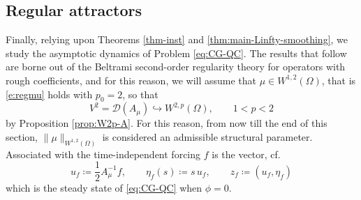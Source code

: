 \documentclass[12pt,leqno]{amsart}
\theoremstyle{definition}
\numberwithin{equation}{section}
\numberwithin{figure}{section}
\begin{document}
 \subsection{Regular   attractors}\label{subsec:main-expattr} Finally, relying upon Theorems \ref{thm-inst} and \ref{thm:main-Linfty-smoothing}, we study the asymptotic dynamics of Problem \eqref{eq:CG-QC}.
The results that follow are borne out of the Beltrami second-order regularity theory for operators with rough coefficients, and for this reason, we will assume  that $\mu \in W^{1,2}(\Omega)$, that is \eqref{e:regmu} holds with $p_0=2$, so that
\[
{V^2} = \mathcal D(A_\mu) \hookrightarrow W^{2,p}(\Omega), \qquad 1<p<2
\]
by Proposition \ref{prop:W2p-A}.
 For this reason, from now till the end of this section,  $\|\mu\|_{W^{1,2}(\Omega)}$ is considered an admissible structural parameter.
Associated with the time-independent forcing $f$ is the vector, cf.\ \cite[(4.1)]{CGDP2010}
\begin{equation}\label{eq:main-zf}
u_f\coloneqq \frac12 A_\mu^{-1}f,\qquad \eta_f(s)\coloneqq s\,u_f,\qquad z_f\coloneqq (u_f,\eta_f)
\end{equation}
which is the steady state of \eqref{eq:CG-QC} when $\phi=0$.
 

 
\end{document}
